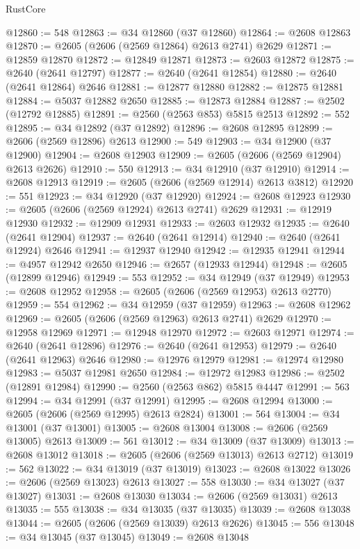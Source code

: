 \begin{lexlean}{RustCore}
\begin{coremodule}
@12860 := 548
@12863 := @34 @12860 (@37 @12860)
@12864 := @2608 @12863
@12870 := @2605 (@2606 (@2569 @12864) @2613 @2741) @2629
@12871 := @12859 @12870
@12872 := @12849 @12871
@12873 := @2603 @12872
@12875 := @2640 (@2641 @12797)
@12877 := @2640 (@2641 @12854)
@12880 := @2640 (@2641 @12864) @2646
@12881 := @12877 @12880
@12882 := @12875 @12881
@12884 := @5037 @12882 @2650
@12885 := @12873 @12884
@12887 := @2502 (@12792 @12885)
@12891 := @2560 (@2563 @853) @5815 @2513
@12892 := 552
@12895 := @34 @12892 (@37 @12892)
@12896 := @2608 @12895
@12899 := @2606 (@2569 @12896) @2613
@12900 := 549
@12903 := @34 @12900 (@37 @12900)
@12904 := @2608 @12903
@12909 := @2605 (@2606 (@2569 @12904) @2613 @2626)
@12910 := 550
@12913 := @34 @12910 (@37 @12910)
@12914 := @2608 @12913
@12919 := @2605 (@2606 (@2569 @12914) @2613 @3812)
@12920 := 551
@12923 := @34 @12920 (@37 @12920)
@12924 := @2608 @12923
@12930 := @2605 (@2606 (@2569 @12924) @2613 @2741) @2629
@12931 := @12919 @12930
@12932 := @12909 @12931
@12933 := @2603 @12932
@12935 := @2640 (@2641 @12904)
@12937 := @2640 (@2641 @12914)
@12940 := @2640 (@2641 @12924) @2646
@12941 := @12937 @12940
@12942 := @12935 @12941
@12944 := @4957 @12942 @2650
@12946 := @2657 (@12933 @12944)
@12948 := @2605 (@12899 @12946)
@12949 := 553
@12952 := @34 @12949 (@37 @12949)
@12953 := @2608 @12952
@12958 := @2605 (@2606 (@2569 @12953) @2613 @2770)
@12959 := 554
@12962 := @34 @12959 (@37 @12959)
@12963 := @2608 @12962
@12969 := @2605 (@2606 (@2569 @12963) @2613 @2741) @2629
@12970 := @12958 @12969
@12971 := @12948 @12970
@12972 := @2603 @12971
@12974 := @2640 (@2641 @12896)
@12976 := @2640 (@2641 @12953)
@12979 := @2640 (@2641 @12963) @2646
@12980 := @12976 @12979
@12981 := @12974 @12980
@12983 := @5037 @12981 @2650
@12984 := @12972 @12983
@12986 := @2502 (@12891 @12984)
@12990 := @2560 (@2563 @862) @5815 @4447
@12991 := 563
@12994 := @34 @12991 (@37 @12991)
@12995 := @2608 @12994
@13000 := @2605 (@2606 (@2569 @12995) @2613 @2824)
@13001 := 564
@13004 := @34 @13001 (@37 @13001)
@13005 := @2608 @13004
@13008 := @2606 (@2569 @13005) @2613
@13009 := 561
@13012 := @34 @13009 (@37 @13009)
@13013 := @2608 @13012
@13018 := @2605 (@2606 (@2569 @13013) @2613 @2712)
@13019 := 562
@13022 := @34 @13019 (@37 @13019)
@13023 := @2608 @13022
@13026 := @2606 (@2569 @13023) @2613
@13027 := 558
@13030 := @34 @13027 (@37 @13027)
@13031 := @2608 @13030
@13034 := @2606 (@2569 @13031) @2613
@13035 := 555
@13038 := @34 @13035 (@37 @13035)
@13039 := @2608 @13038
@13044 := @2605 (@2606 (@2569 @13039) @2613 @2626)
@13045 := 556
@13048 := @34 @13045 (@37 @13045)
@13049 := @2608 @13048

\end{coremodule}
\end{lexlean}
